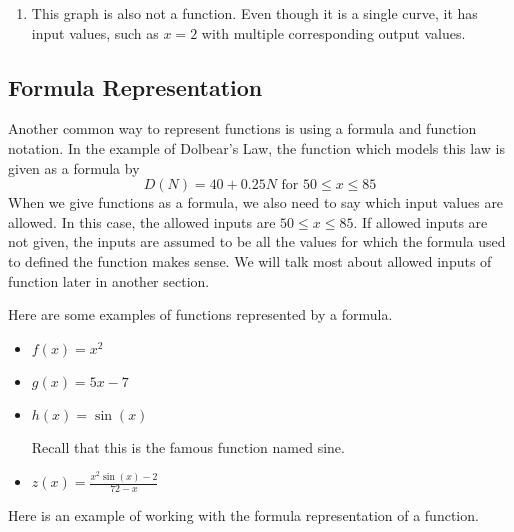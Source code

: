 \documentclass[noauthor, nooutcomes]{ximera}
\begin{document}
\begin{example}
\begin{explanation}
\begin{enumerate}[label=\alph*.]
\item 
This graph is also not a function.  Even though it is a single curve, it has input values, such as $x=2$ with multiple corresponding output values.

\begin{image}
\end{image}

 \end{enumerate}
\end{explanation}
\end{example}
 
 \subsection{Formula Representation}
 Another common way to represent functions is using a formula and function notation.  In the example of Dolbear's Law, the function which models this law is given as a formula by 
 $$D(N)=40+0.25N \text{ for } 50 \leq x \leq 85$$
 When we give functions as a formula, we also need to say which input values are allowed.  In this case, the allowed inputs are $50 \leq x \leq 85$.  If allowed inputs are not given, the inputs are assumed to be all the values for which the formula used to defined the function makes sense.  We will talk most about allowed inputs of function later in another section.
 
 Here are some examples of functions represented by a formula.
 
\begin{itemize}
\item $f(x)=x^2$
\item $g(x)=5x-7$
\item $h(x)=\sin(x)$  

Recall that this is the famous function named sine.
\item $z(x)=\frac{x^2\sin(x)-2}{72-x}$
\end{itemize}

Here is an example of working with the formula representation of a function.
\end{document}
